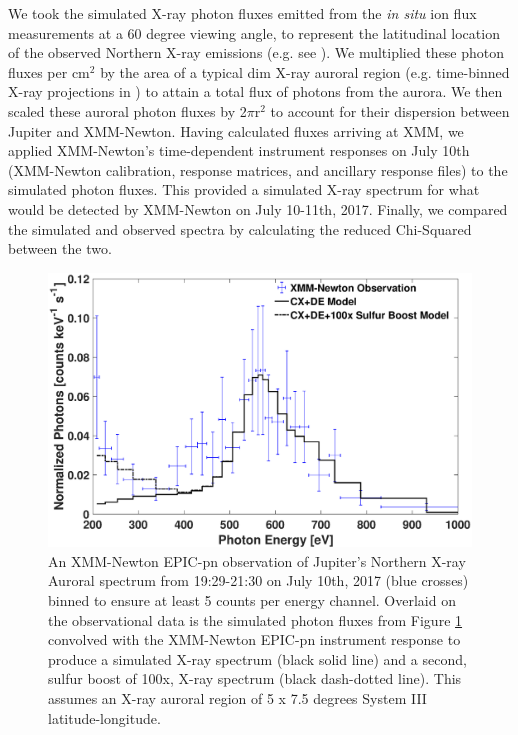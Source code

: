 \documentclass[draft]{agujournal2018}
\begin{document}
We took the simulated X-ray photon fluxes emitted from the \textit{in situ} ion flux measurements at a 60 degree viewing angle, to represent the latitudinal location of the observed Northern X-ray emissions (e.g. see \citet{gladstone2002,dunn2017}).
We multiplied these photon fluxes per cm$^2$ by the area of a typical dim X-ray auroral region (e.g. time-binned X-ray projections in \citet{dunn2016}) to attain a total flux of photons from the aurora.
We then scaled these auroral photon fluxes by 2$\pi$r$^2$ to account for their dispersion between Jupiter and XMM-Newton.
Having calculated fluxes arriving at XMM, we applied XMM-Newton’s time-dependent instrument responses on July 10th (XMM-Newton calibration, response matrices, and ancillary response files) to the simulated photon fluxes.
This provided a simulated X-ray spectrum for what would be detected by XMM-Newton on July 10-11th, 2017.
Finally, we compared the simulated and observed spectra by calculating the reduced Chi-Squared between the two.

\begin{figure}[ht]
    \centering
    \includegraphics[width=\textwidth]{Figures/XMMNewtonComparison.eps}
    \caption{An XMM-Newton EPIC-pn observation of Jupiter’s Northern X-ray Auroral spectrum from 19:29-21:30 on July 10th, 2017 (blue crosses) binned to ensure at least 5 counts per energy channel. Overlaid on the observational data is the simulated photon fluxes from Figure \ref{fig:XraySpectrumXMM} convolved with the XMM-Newton EPIC-pn instrument response to produce a simulated X-ray spectrum (black solid line) and a second, sulfur boost of 100x, X-ray spectrum (black dash-dotted line). This assumes an X-ray auroral region of 5 x 7.5 degrees System III latitude-longitude.}
    \label{fig:XraySpectrumXMM}
\end{figure}
\end{document}

